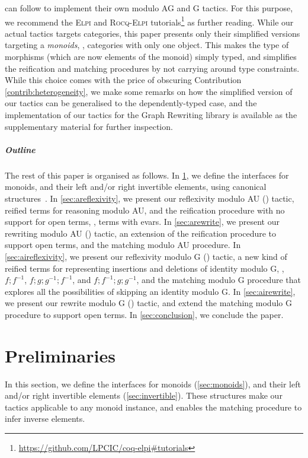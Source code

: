 \documentclass[a4paper,UKenglish,cleveref,autoref]{lipics-v2021}
\newcommand{\Elpi}{{\sffamily\scshape Elpi}\xspace}
\newcommand{\RocqElpi}{{\sffamily\scshape Rocq-Elpi}\xspace}
\begin{document}
can follow to implement their own modulo AG and G tactics.
For this purpose, we recommend the \Elpi and \RocqElpi
tutorials\footnote{\url{https://github.com/LPCIC/coq-elpi\#tutorials}} as further reading.
While our actual tactics targets categories, this paper presents only their simplified versions
targeting a \emph{monoids}, \ie, categories with only one object.
This makes the type of morphisms (which are now elements of the monoid) simply typed, and simplifies
the reification and matching procedures by not carrying around type constraints.
While this choice comes with the price of obscuring Contribution \ref{contrib:heterogeneity},
we make some remarks on how the simplified version of our tactics can be generalised to the
dependently-typed case, and the implementation of our tactics for the Graph Rewriting
library is available as the supplementary material for further inspection.

\subparagraph{Outline}
The rest of this paper is organised as follows.
In \cref{sec:prelim}, we define the interfaces for monoids, and their left and/or right invertible
elements, using canonical structures~\cite{DBLP:conf/itp/MahboubiT13,rocqrefman:canonical}.
In \cref{sec:areflexivity}, we present our reflexivity modulo AU () tactic,
reified terms for reasoning modulo AU, and the reification procedure with no support for open terms,
\ie, terms with evars.
In \cref{sec:arewrite}, we present our rewriting modulo AU () tactic, an extension of
the reification procedure to support open terms, and the matching modulo AU procedure.
In \cref{sec:aireflexivity}, we present our reflexivity modulo G () tactic, a
new kind of reified terms for representing insertions and deletions of identity modulo G, \eg,
$f ; f^{-1}$, $f ; g ; g^{-1} ; f^{-1}$, and $f ; f^{-1}; g ; g^{-1}$, and the matching modulo G
procedure that explores all the possibilities of skipping an identity modulo G.
In \cref{sec:airewrite}, we present our rewrite modulo G () tactic, and extend the
matching modulo G procedure to support open terms.
In \cref{sec:conclusion}, we conclude the paper.

\section{Preliminaries}
\label{sec:prelim}

In this section, we define the interfaces for monoids (\cref{sec:monoids}), and their left and/or
right invertible elements (\cref{sec:invertible}).
These structures make our tactics applicable to any monoid instance, and enables the matching
procedure to infer inverse elements.
\end{document}

